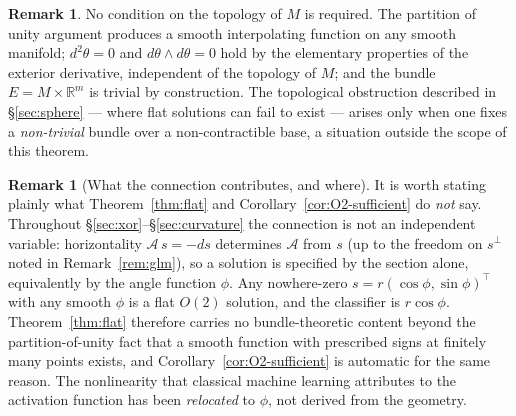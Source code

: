 \documentclass[11pt, a4paper]{article}
\theoremstyle{plain}
\theoremstyle{definition}
\newtheorem{remark}[theorem]{Remark}
\newcommand{\R}{\mathbb{R}}
\newcommand{\Sig}{\mathcal{A}}
\begin{document}
\begin{remark}
No condition on the topology of $M$ is required. The partition of unity
argument produces a smooth interpolating function on any smooth manifold;
$d^2\theta = 0$ and $d\theta\wedge d\theta = 0$ hold by the elementary
properties of the exterior derivative, independent of the topology of $M$;
and the bundle $E = M\times\R^m$ is trivial by construction. The topological
obstruction described in \S\ref{sec:sphere} --- where flat solutions can fail to
exist --- arises only when one fixes a \emph{non-trivial} bundle over a
non-contractible base, a situation outside the scope of this theorem.
\end{remark}

\begin{remark}[What the connection contributes, and where]
\label{rem:connection-derived}
It is worth stating plainly what Theorem~\ref{thm:flat} and
Corollary~\ref{cor:O2-sufficient} do \emph{not} say. Throughout
\S\ref{sec:xor}--\S\ref{sec:curvature} the connection is not an independent
variable: horizontality $\Sig\,s = -ds$ determines $\Sig$ from $s$ (up to the
freedom on $s^\perp$ noted in Remark~\ref{rem:glm}), so a solution is specified
by the section alone, equivalently by the angle function $\phi$. Any nowhere-zero
$s = r(\cos\phi,\sin\phi)^\top$ with any smooth $\phi$ is a flat $O(2)$ solution,
and the classifier is $r\cos\phi$. Theorem~\ref{thm:flat} therefore carries no
bundle-theoretic content beyond the partition-of-unity fact that a smooth
function with prescribed signs at finitely many points exists, and
Corollary~\ref{cor:O2-sufficient} is automatic for the same reason. The
nonlinearity that classical machine learning attributes to the activation
function has been \emph{relocated} to $\phi$, not derived from the geometry.


\end{remark}
\end{document}
